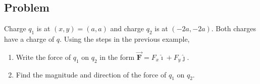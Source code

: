 \documentclass{article}
\newcommand{\ihat}[0]{\hat{\boldsymbol{\imath}}}
\newcommand{\jhat}[0]{\hat{\boldsymbol{\jmath}}}
\newcommand{\bfvec}[1]{\vec{\mathbf{#1}}}
\begin{document}
\subsection{Problem}

Charge $q_1$ is at $(x,y)=(a,a)$ and charge $q_2$ is at $(-2a, -2a)$. Both charges have a charge of $q$. Using the steps in the previous example,

\begin{enumerate}

  \item Write the force of $q_1$ on $q_2$ in the form $\bfvec{F}=F_x\ihat + F_y\jhat$.

  \item Find the magnitude and direction of the force of $q_1$ on $q_2$.

\end{enumerate}
\end{document}
